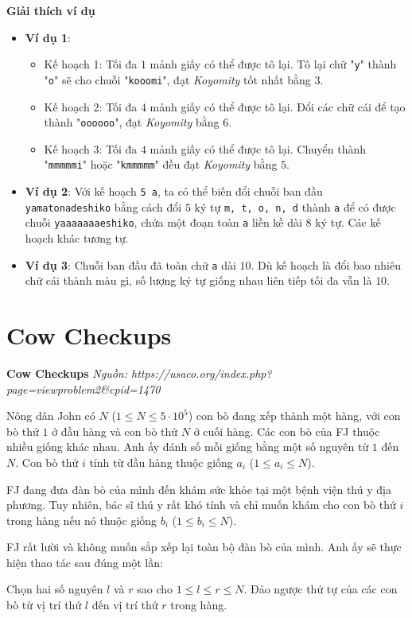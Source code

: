 \documentclass[12pt,a4paper]{article}
\newcommand{\problem}[2]{%
  \begin{mdframed}[
    linecolor=framecolor,
    linewidth=1.5pt,
    backgroundcolor=white,
    topline=true, bottomline=true,
    leftline=true, rightline=true,
    innerleftmargin=10pt, innerrightmargin=10pt,
    innertopmargin=6pt, innerbottommargin=6pt,
  ]
  \textbf{\large #1} \hfill \textit{Nguồn: #2}
  \end{mdframed}
  \vspace{4pt}%
}
\newcommand{\explanation}{%
  \vspace{6pt}\textbf{\textcolor{sectioncolor}{Giải thích ví dụ}}\par\vspace{2pt}%
}
\begin{document}
\explanation
\begin{itemize}
    \item \textbf{Ví dụ 1}:
    \begin{itemize}
        \item Kế hoạch 1: Tối đa $1$ mảnh giấy có thể được tô lại. Tô lại chữ "\texttt{y}" thành "\texttt{o}" sẽ cho chuỗi "\texttt{kooomi}", đạt \textit{Koyomity} tốt nhất bằng $3$.
        \item Kế hoạch 2: Tối đa $4$ mảnh giấy có thể được tô lại. Đổi các chữ cái để tạo thành "\texttt{oooooo}", đạt \textit{Koyomity} bằng $6$.
        \item Kế hoạch 3: Tối đa $4$ mảnh giấy có thể được tô lại. Chuyển thành "\texttt{mmmmmi}" hoặc "\texttt{kmmmmm}" đều đạt \textit{Koyomity} bằng $5$.
    \end{itemize}
    \item \textbf{Ví dụ 2}: Với kế hoạch \texttt{5 a}, ta có thể biến đổi chuỗi ban đầu \texttt{yamatonadeshiko} bằng cách đổi $5$ ký tự \texttt{m, t, o, n, d} thành \texttt{a} để có được chuỗi \texttt{yaaaaaaaeshiko}, chứa một đoạn toàn \texttt{a} liền kề dài $8$ ký tự. Các kế hoạch khác tương tự.
    \item \textbf{Ví dụ 3}: Chuỗi ban đầu đã toàn chữ \texttt{a} dài $10$. Dù kế hoạch là đổi bao nhiêu chữ cái thành màu gì, số lượng ký tự giống nhau liên tiếp tối đa vẫn là $10$.
\end{itemize}


\section{Cow Checkups}
\problem{Cow Checkups}{https://usaco.org/index.php?page=viewproblem2\&cpid=1470}

Nông dân John có $N$ ($1 \le N \le 5 \cdot 10^5$) con bò đang xếp thành một hàng, với con bò thứ $1$ ở đầu hàng và con bò thứ $N$ ở cuối hàng. Các con bò của FJ thuộc nhiều giống khác nhau. Anh ấy đánh số mỗi giống bằng một số nguyên từ $1$ đến $N$. Con bò thứ $i$ tính từ đầu hàng thuộc giống $a_i$ ($1 \le a_i \le N$).

FJ đang đưa đàn bò của mình đến khám sức khỏe tại một bệnh viện thú y địa phương. Tuy nhiên, bác sĩ thú y rất khó tính và chỉ muốn khám cho con bò thứ $i$ trong hàng nếu nó thuộc giống $b_i$ ($1 \le b_i \le N$).

FJ rất lười và không muốn sắp xếp lại toàn bộ đàn bò của mình. Anh ấy sẽ thực hiện thao tác sau đúng một lần:

Chọn hai số nguyên $l$ và $r$ sao cho $1 \le l \le r \le N$. Đảo ngược thứ tự của các con bò từ vị trí thứ $l$ đến vị trí thứ $r$ trong hàng.
\end{document}
